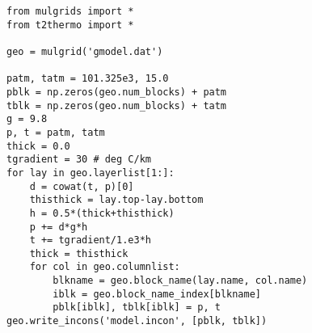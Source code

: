 \begin{lstlisting}
from mulgrids import *
from t2thermo import *

geo = mulgrid('gmodel.dat')

patm, tatm = 101.325e3, 15.0
pblk = np.zeros(geo.num_blocks) + patm
tblk = np.zeros(geo.num_blocks) + tatm
g = 9.8
p, t = patm, tatm
thick = 0.0
tgradient = 30 # deg C/km
for lay in geo.layerlist[1:]:
    d = cowat(t, p)[0]
    thisthick = lay.top-lay.bottom
    h = 0.5*(thick+thisthick)
    p += d*g*h
    t += tgradient/1.e3*h
    thick = thisthick
    for col in geo.columnlist:
        blkname = geo.block_name(lay.name, col.name)
        iblk = geo.block_name_index[blkname]
        pblk[iblk], tblk[iblk] = p, t
geo.write_incons('model.incon', [pblk, tblk])
\end{lstlisting}
